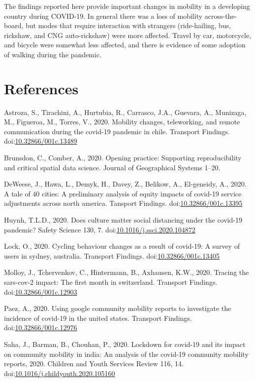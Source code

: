 \documentclass[]{elsarticle} %
\begin{document}
The findings reported here provide important changes in mobility in a
developing country during COVID-19. In general there was a loss of
mobility across-the-board, but modes that require interaction with
strangers (ride-hailing, bus, rickshaw, and CNG auto-rickshaw) were more
affected. Travel by car, motorcycle, and bicycle were somewhat less
affected, and there is evidence of some adoption of walking during the
pandemic.

\hypertarget{references}{%
\section*{References}\label{references}}

\hypertarget{refs}{}
\leavevmode\hypertarget{ref-Astroza2020mobility}{}%
Astroza, S., Tirachini, A., Hurtubia, R., Carrasco, J.A., Guevara, A.,
Munizaga, M., Figueroa, M., Torres, V., 2020. Mobility changes,
teleworking, and remote communication during the covid-19 pandemic in
chile. Transport Findings.
doi:\href{https://doi.org/10.32866/001c.13489}{10.32866/001c.13489}

\leavevmode\hypertarget{ref-Brunsdon2020opening}{}%
Brunsdon, C., Comber, A., 2020. Opening practice: Supporting
reproducibility and critical spatial data science. Journal of
Geographical Systems 1--20.

\leavevmode\hypertarget{ref-DeWeese2020tale}{}%
DeWeese, J., Hawa, L., Demyk, H., Davey, Z., Belikow, A., El-geneidy,
A., 2020. A tale of 40 cities: A preliminary analysis of equity impacts
of covid-19 service adjustments across north america. Tansport Findings.
doi:\href{https://doi.org/10.32866/001c.13395}{10.32866/001c.13395}

\leavevmode\hypertarget{ref-Huynh2020culture}{}%
Huynh, T.L.D., 2020. Does culture matter social distancing under the
covid-19 pandemic? Safety Science 130, 7.
doi:\href{https://doi.org/10.1016/j.ssci.2020.104872}{10.1016/j.ssci.2020.104872}

\leavevmode\hypertarget{ref-Lock2020cycling}{}%
Lock, O., 2020. Cycling behaviour changes as a result of covid-19: A
survey of users in sydney, australia. Transport Findings.
doi:\href{https://doi.org/10.32866/001c.13405}{10.32866/001c.13405}

\leavevmode\hypertarget{ref-Molloy2020tracing}{}%
Molloy, J., Tchervenkov, C., Hintermann, B., Axhausen, K.W., 2020.
Tracing the sars-cov-2 impact: The first month in switzerland. Transport
Findings.
doi:\href{https://doi.org/10.32866/001c.12903}{10.32866/001c.12903}

\leavevmode\hypertarget{ref-Paez2020using}{}%
Paez, A., 2020. Using google community mobility reports to investigate
the incidence of covid-19 in the united states. Transport Findings.
doi:\href{https://doi.org/10.32866/001c.12976}{10.32866/001c.12976}

\leavevmode\hypertarget{ref-Saha2020lockdown}{}%
Saha, J., Barman, B., Chouhan, P., 2020. Lockdown for covid-19 and its
impact on community mobility in india: An analysis of the covid-19
community mobility reports, 2020. Children and Youth Services Review
116, 14.
doi:\href{https://doi.org/10.1016/j.childyouth.2020.105160}{10.1016/j.childyouth.2020.105160}
\end{document}
